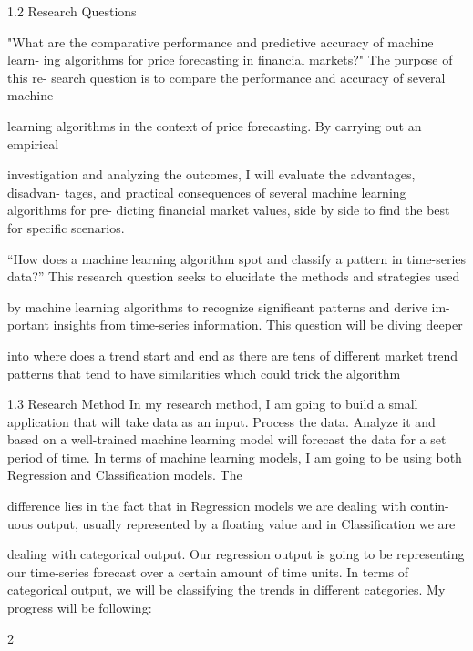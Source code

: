 \documentclass{imc-inf}
\begin{document}
1.2 Research Questions

"What are the comparative performance and predictive accuracy of machine learn-
ing algorithms for price forecasting in financial markets?" The purpose of this re-
search question is to compare the performance and accuracy of several machine

learning algorithms in the context of price forecasting. By carrying out an empirical

investigation and analyzing the outcomes, I will evaluate the advantages, disadvan-
tages, and practical consequences of several machine learning algorithms for pre-
dicting financial market values, side by side to find the best for specific scenarios.

“How does a machine learning algorithm spot and classify a pattern in time-series
data?” This research question seeks to elucidate the methods and strategies used

by machine learning algorithms to recognize significant patterns and derive im-
portant insights from time-series information. This question will be diving deeper

into where does a trend start and end as there are tens of different market trend
patterns that tend to have similarities which could trick the algorithm

1.3 Research Method
In my research method, I am going to build a small application that will take data as
an input. Process the data. Analyze it and based on a well-trained machine learning
model will forecast the data for a set period of time. In terms of machine learning
models, I am going to be using both Regression and Classification models. The

difference lies in the fact that in Regression models we are dealing with contin-
uous output, usually represented by a floating value and in Classification we are

dealing with categorical output. Our regression output is going to be representing
our time-series forecast over a certain amount of time units. In terms of categorical
output, we will be classifying the trends in different categories. My progress will be
following:

2
\end{document}

